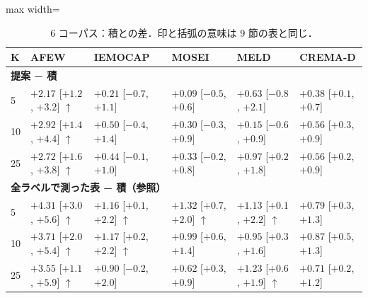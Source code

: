\begin{table}[H]\centering\small
\caption{6 コーパス：積との差．印と括弧の意味は 9 節の表と同じ．}
\setlength{\tabcolsep}{5pt}
\begin{adjustbox}{max width=\linewidth}
\begin{tabular}{llllll}
\toprule
K & AFEW & IEMOCAP & MOSEI & MELD & CREMA-D \\
\midrule
\multicolumn{6}{l}{\textbf{提案 − 積}} \\
5 & \textbf{$+2.17$} {\scriptsize[$+1.2$, $+3.2$]} $\uparrow$ & $+0.21$ {\scriptsize[$-0.7$, $+1.1$]} & $+0.09$ {\scriptsize[$-0.5$, $+0.6$]} & $+0.63$ {\scriptsize[$-0.8$, $+2.1$]} & $+0.38$ {\scriptsize[$+0.1$, $+0.7$]} \\
10 & \textbf{$+2.92$} {\scriptsize[$+1.4$, $+4.4$]} $\uparrow$ & $+0.50$ {\scriptsize[$-0.4$, $+1.4$]} & $+0.30$ {\scriptsize[$-0.3$, $+0.9$]} & $+0.15$ {\scriptsize[$-0.6$, $+0.9$]} & $+0.56$ {\scriptsize[$+0.3$, $+0.9$]} \\
25 & \textbf{$+2.72$} {\scriptsize[$+1.6$, $+3.8$]} $\uparrow$ & $+0.44$ {\scriptsize[$-0.1$, $+1.0$]} & $+0.33$ {\scriptsize[$-0.2$, $+0.8$]} & $+0.97$ {\scriptsize[$+0.2$, $+1.8$]} & $+0.56$ {\scriptsize[$+0.2$, $+0.9$]} \\
\midrule
\multicolumn{6}{l}{\textbf{全ラベルで測った表 − 積（参照）}} \\
5 & \textbf{$+4.31$} {\scriptsize[$+3.0$, $+5.6$]} $\uparrow$ & \textbf{$+1.16$} {\scriptsize[$+0.1$, $+2.2$]} $\uparrow$ & \textbf{$+1.32$} {\scriptsize[$+0.7$, $+2.0$]} $\uparrow$ & \textbf{$+1.13$} {\scriptsize[$+0.1$, $+2.2$]} $\uparrow$ & $+0.79$ {\scriptsize[$+0.3$, $+1.3$]} \\
10 & \textbf{$+3.71$} {\scriptsize[$+2.0$, $+5.4$]} $\uparrow$ & \textbf{$+1.17$} {\scriptsize[$+0.2$, $+2.2$]} $\uparrow$ & $+0.99$ {\scriptsize[$+0.6$, $+1.4$]} & $+0.95$ {\scriptsize[$+0.3$, $+1.6$]} & $+0.87$ {\scriptsize[$+0.5$, $+1.3$]} \\
25 & \textbf{$+3.55$} {\scriptsize[$+1.1$, $+5.9$]} $\uparrow$ & $+0.90$ {\scriptsize[$-0.2$, $+2.0$]} & $+0.62$ {\scriptsize[$+0.3$, $+0.9$]} & \textbf{$+1.23$} {\scriptsize[$+0.6$, $+1.9$]} $\uparrow$ & $+0.71$ {\scriptsize[$+0.2$, $+1.2$]} \\
\bottomrule
\end{tabular}
\end{adjustbox}
\end{table}

